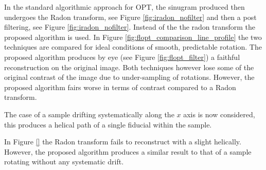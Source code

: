 In the standard algorithmic approach for OPT, the sinugram produced then undergoes the Radon transform, see Figure \ref{fig:iradon_nofilter} and then a post filtering, see Figure \ref{fig:iradon_nofilter}.
Instead of the the radon transform the proposed algorithm is used.
In Figure \ref{fig:flopt_comparison_line_profile} the two techniques are compared for ideal conditions of smooth, predictable rotation.
The proposed algorithm produces by eye (see Figure \ref{fig:flopt_filter}) a faithful reconstruction on the original image.
Both techniques however lose some of the original contrast of the image due to under-sampling of rotations.
However, the proposed algorithm fairs worse in terms of contrast compared to a Radon transform.

The case of a sample drifting systematically along the $x$ axis is now considered, this produces a helical path of a single fiducial within the sample.

In Figure \ref{} the Radon transform fails to reconstruct with a slight helically.
However, the proposed algorithm produces a similar result to that of a sample rotating without any systematic drift.


